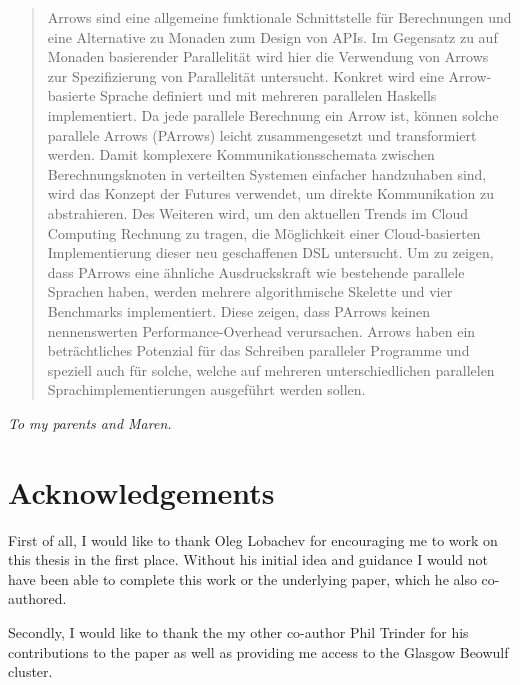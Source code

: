 \documentclass[paper=A4,twoside=true,openright,parskip=full,chapterprefix=true,headings=normal,bibliography=totoc,listof=totoc,titlepage=on,captions=tableabove,draft=false,british]{scrreprt}%
\begin{document}
\pagestyle{plain}
\begin{abstract}
Arrows sind eine allgemeine funktionale Schnittstelle für Berechnungen und eine Alternative zu Monaden zum Design von APIs.
Im Gegensatz zu auf Monaden basierender Parallelität wird hier die Verwendung von Arrows zur Spezifizierung von Parallelität untersucht.
Konkret wird eine Arrow-basierte Sprache definiert und mit mehreren parallelen Haskells implementiert.
Da jede parallele Berechnung ein Arrow ist, können solche parallele Arrows (PArrows) leicht zusammengesetzt und transformiert werden.
Damit komplexere Kommunikationsschemata zwischen Berechnungsknoten in verteilten Systemen einfacher handzuhaben sind, wird das Konzept der Futures verwendet,
um direkte Kommunikation zu abstrahieren.
Des Weiteren wird, um den aktuellen Trends im Cloud Computing Rechnung zu tragen, die Möglichkeit einer Cloud-basierten Implementierung dieser
neu geschaffenen DSL untersucht.
Um zu zeigen, dass PArrows eine ähnliche Ausdruckskraft wie bestehende parallele Sprachen haben,
werden mehrere algorithmische Skelette und vier Benchmarks implementiert.
Diese zeigen, dass PArrows keinen nennenswerten Performance-Overhead verursachen.
Arrows haben ein beträchtliches Potenzial für das Schreiben paralleler Programme und speziell auch für solche,
welche auf mehreren unterschiedlichen parallelen Sprachimplementierungen ausgeführt werden sollen.
\end{abstract}
\cleardoublepage

\pagestyle{empty}
\begin{center}
\vspace*{\fill}
\textit{To my parents and Maren.}
\vspace*{\fill}
\end{center}

\cleardoublepage

\chapter*{Acknowledgements}
\thispagestyle{empty}

First of all, I would like to thank Oleg Lobachev for encouraging me
to work on this thesis in the first place.
Without his initial idea and guidance I would
not have been able to complete this work or the underlying paper,
which he also co-authored.

Secondly, I would like to thank the my other co-author
Phil Trinder for his contributions to the paper as well as providing me access to the
Glasgow Beowulf cluster.
\end{document}
